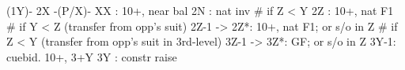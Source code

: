 (1Y)- 2X -(P/X)-
XX : 10+, near bal
2N : nat inv
# if Z < Y
2Z : 10+, nat F1
# if Y < Z (transfer from opp's suit)
2Z-1 -> 2Z*: 10+, nat F1; or s/o in Z
# if Z < Y (transfer from opp's suit in 3rd-level)
3Z-1 -> 3Z*: GF; or s/o in Z
3Y-1: cuebid. 10+, 3+Y
3Y : constr raise
